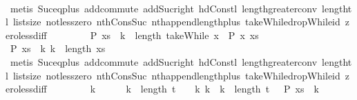 \begin{isabellebody}
\ \ \ \ \ \ \isamarkupfalse%
\ {\isacharparenleft}metis\ Suc{\isacharunderscore}eq{\isacharunderscore}plus{}\ add{\isachardot}commute\ add{\isacharunderscore}Suc{\isacharunderscore}right\ hd{\isacharunderscore}Cons{\isacharunderscore}tl\ length{\isacharunderscore}greater{\isacharunderscore}{}{\isacharunderscore}conv\ length{\isacharunderscore}tl\ list{\isachardot}size{\isacharparenleft}{}{\isacharparenright}\ not{\isacharunderscore}less{\isacharunderscore}zero\ nth{\isacharunderscore}Cons{\isacharunderscore}Suc\ nth{\isacharunderscore}append{\isacharunderscore}length{\isacharunderscore}plus\ takeWhile{\isacharunderscore}dropWhile{\isacharunderscore}id\ zero{\isacharunderscore}less{\isacharunderscore}diff{\isacharparenright}\isanewline
\ \ \isamarkupfalse%
\isanewline
\ \ \ \ \isamarkupfalse%
\ {\isachardoublequoteopen}P\ {\isacharparenleft}xs\ {\isacharbang}\ {\isacharparenleft}k{}\ {\isacharplus}\ length\ {\isacharparenleft}takeWhile\ {\isacharparenleft}{\isasymlambda}x{\isachardot}\ {\isasymnot}\ P\ x{\isacharparenright}\ xs{\isacharparenright}\ {\isacharplus}\ {}{\isacharparenright}{\isacharparenright}{\isachardoublequoteclose}\isanewline
\ \ \ \ \ \ \isamarkupfalse%
\ {\isacharbackquoteopen}P\ {\isacharparenleft}{\isacharquery}xs\ {\isacharbang}\ k{}{\isacharparenright}{\isacharbackquoteclose}\ {\isacharbackquoteopen}k{}\ {\isacharless}\ length\ {\isacharquery}xs{\isacharbackquoteclose}\ {\isacharasterisk}\isanewline
\ \ \ \ \ \ \isamarkupfalse%
\ {\isacharparenleft}metis\ Suc{\isacharunderscore}eq{\isacharunderscore}plus{}\ add{\isachardot}commute\ add{\isacharunderscore}Suc{\isacharunderscore}right\ hd{\isacharunderscore}Cons{\isacharunderscore}tl\ length{\isacharunderscore}greater{\isacharunderscore}{}{\isacharunderscore}conv\ length{\isacharunderscore}tl\ list{\isachardot}size{\isacharparenleft}{}{\isacharparenright}\ not{\isacharunderscore}less{\isacharunderscore}zero\ nth{\isacharunderscore}Cons{\isacharunderscore}Suc\ nth{\isacharunderscore}append{\isacharunderscore}length{\isacharunderscore}plus\ takeWhile{\isacharunderscore}dropWhile{\isacharunderscore}id\ zero{\isacharunderscore}less{\isacharunderscore}diff{\isacharparenright}\isanewline
\ \ \isamarkupfalse%
\isanewline
\ \ \ \ \isamarkupfalse%
\ k{\isacharprime}\isanewline
\ \ \ \ \isamarkupfalse%
\ {\isachardoublequoteopen}k{}\ {\isacharplus}\ length\ {\isacharquery}t\ {\isacharplus}\ {}\ {\isacharless}\ k{\isacharprime}{\isachardoublequoteclose}\ {\isachardoublequoteopen}k{\isacharprime}\ {\isacharless}\ k{}\ {\isacharplus}\ length\ {\isacharquery}t\ {\isacharplus}\ {}{\isachardoublequoteclose}\ {\isachardoublequoteopen}P\ {\isacharparenleft}xs\ {\isacharbang}\ k{\isacharprime}{\isacharparenright}{\isachardoublequoteclose}\isanewline

\end{isabellebody}
